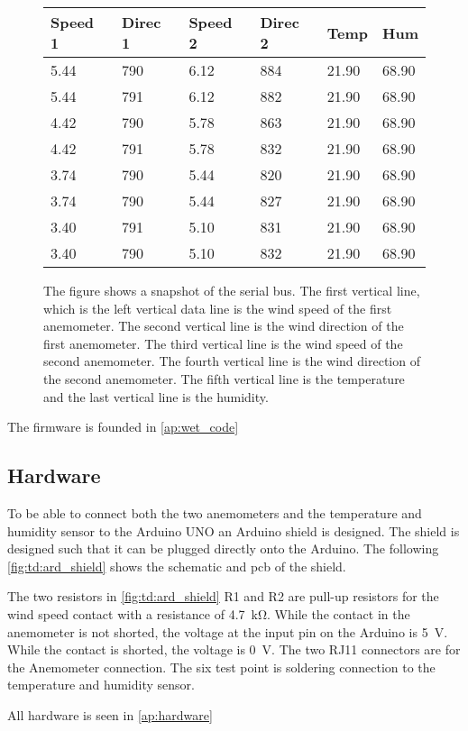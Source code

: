 \begin{figure}[H]
\centering
      \captionsetup{width=0.57\linewidth}
      \footnotesize
\begin{tabular}{llllll}
Speed 1 & Direc 1 & Speed 2 & Direc 2 & Temp  & Hum   \\ \hline
5.44    & 790     & 6.12    & 884     & 21.90 & 68.90 \\
5.44    & 791     & 6.12    & 882     & 21.90 & 68.90 \\
4.42    & 790     & 5.78    & 863     & 21.90 & 68.90 \\
4.42    & 791     & 5.78    & 832     & 21.90 & 68.90 \\
3.74    & 790     & 5.44    & 820     & 21.90 & 68.90 \\
3.74    & 790     & 5.44    & 827     & 21.90 & 68.90 \\
3.40    & 791     & 5.10    & 831     & 21.90 & 68.90 \\
3.40    & 790     & 5.10    & 832     & 21.90 & 68.90
\end{tabular}
\caption{The figure shows a snapshot of the serial bus. The first vertical line, which is the left vertical data line is the wind speed of the first anemometer.  The second vertical line is the wind direction of the first anemometer. The third vertical line is the wind speed of the second anemometer.  The fourth vertical line is the wind direction of the second anemometer. The fifth vertical line is the temperature and the last vertical line is the humidity.}
\label{tp:com_snapshot}
\end{figure}%


The firmware is founded in \autoref{ap:wet_code}


\subsection{Hardware}

To be able to connect both the two anemometers and the temperature and humidity sensor to the Arduino UNO an Arduino shield is designed. The shield is designed such that it can be plugged directly onto the Arduino. The following \autoref{fig:td:ard_shield} shows the schematic and \gls{pcb} of the shield. 




The two resistors in \autoref{fig:td:ard_shield} R1 and R2 are pull-up resistors for the wind speed contact with a resistance of \SI{4.7}{\kilo\ohm}. While the contact in the anemometer is not shorted, the voltage at the input pin on the Arduino is \SI{5}{\volt}. While the contact is shorted, the voltage is \SI{0}{\volt}. The two RJ11 connectors are for the Anemometer connection. The six test point is soldering connection to the temperature and humidity sensor. 

All hardware is seen in \autoref{ap:hardware}







